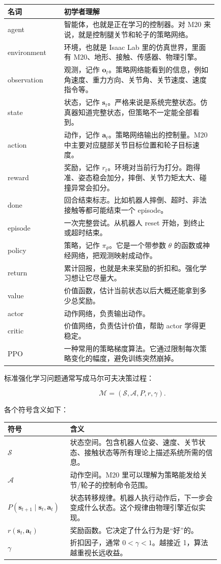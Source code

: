 \documentclass[UTF8,11pt,a4paper]{ctexart}
\newcommand{\bs}[1]{\bm{#1}}
\begin{document}
\begin{center}
\begin{tabular}{p{0.22\linewidth}p{0.60\linewidth}}
\toprule
名词 & 初学者理解 \\
\midrule
agent & 智能体，也就是正在学习的控制器。对 M20 来说，就是控制腿关节和轮子的策略网络。\\
environment & 环境，也就是 Isaac Lab 里的仿真世界，里面有 M20、地形、接触、传感器、物理引擎。\\
observation & 观测，记作 \(\bs o_t\)。策略网络能看到的信息，例如角速度、重力方向、关节角、关节速度、速度指令等。\\
state & 状态，记作 \(\bs s_t\)。严格来说是系统完整状态。仿真器知道完整状态，但策略不一定能全部看到。\\
action & 动作，记作 \(\bs a_t\)。策略网络输出的控制量。M20 中主要对应腿部关节目标位置和轮子目标速度。\\
reward & 奖励，记作 \(r_t\)。环境对当前行为打分。跑得准、姿态稳会加分，摔倒、关节力矩太大、碰撞异常会扣分。\\
done & 回合结束标志。比如机器人摔倒、超时、非法接触等都可能结束一个 episode。\\
episode & 一次完整尝试。从机器人 reset 开始，到终止或超时结束。\\
policy & 策略，记作 \(\pi_\theta\)。它是一个带参数 \(\theta\) 的函数或神经网络，把观测映射成动作。\\
return & 累计回报，也就是未来奖励的折扣和。强化学习想让它尽量大。\\
value & 价值函数，估计当前状态以后大概还能拿到多少总奖励。\\
actor & 动作网络，负责输出动作。\\
critic & 价值网络，负责估计价值，帮助 actor 学得更稳定。\\
PPO & 一种常用的策略梯度算法。它通过限制每次策略变化的幅度，避免训练突然崩掉。\\
\bottomrule
\end{tabular}
\end{center}

标准强化学习问题通常写成马尔可夫决策过程：

\[
\mathcal M=(\mathcal S,\mathcal A,P,r,\gamma).
\]

各个符号含义如下：

\begin{center}
\begin{tabular}{p{0.18\linewidth}p{0.65\linewidth}}
\toprule
符号 & 含义 \\
\midrule
\(\mathcal S\) & 状态空间。包含机器人位姿、速度、关节状态、接触状态等所有理论上描述系统所需的信息。\\
\(\mathcal A\) & 动作空间。M20 里可以理解为策略能发给关节/轮子的控制命令范围。\\
\(P(\bs s_{t+1}\mid \bs s_t,\bs a_t)\) & 状态转移规律。机器人执行动作后，下一步会变成什么状态。这个规律由物理引擎近似实现。\\
\(r(\bs s_t,\bs a_t)\) & 奖励函数。它决定了什么行为是“好”的。\\
\(\gamma\) & 折扣因子，通常 \(0<\gamma<1\)。越接近 1，算法越重视长远收益。\\
\bottomrule
\end{tabular}
\end{center}
\end{document}
